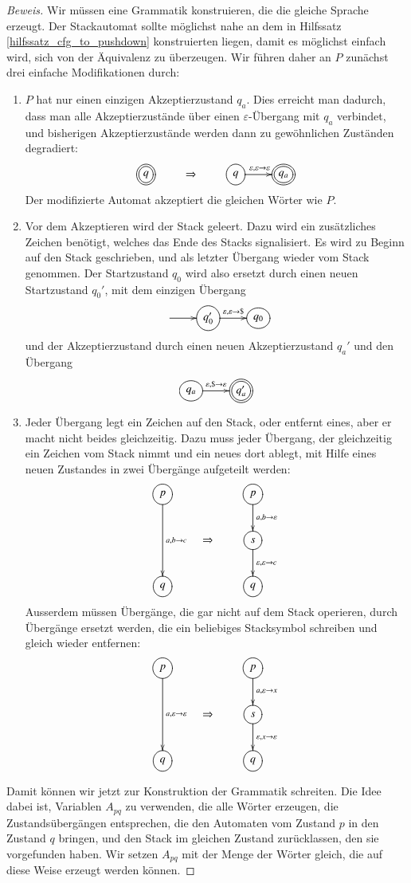 \begin{proof}[Beweis]
Wir müssen eine Grammatik konstruieren, die die gleiche Sprache
erzeugt.
Der Stackautomat sollte möglichst nahe an dem in
Hilfssatz \ref{hilfssatz_cfg_to_pushdown} konstruierten liegen, damit es
möglichst einfach wird, sich von der Äquivalenz zu überzeugen.
Wir führen daher an $P$ zunächst drei einfache Modifikationen
durch: 
\begin{enumerate}
\item $P$ hat nur einen einzigen Akzeptierzustand
$q_a$.
Dies erreicht man dadurch, dass man alle Akzeptierzustände über
einen $\varepsilon$-Übergang mit
$q_a$ verbindet, und bisherigen Akzeptierzustände
werden dann zu gewöhnlichen Zuständen degradiert:
\[
\xymatrix{
*++[o][F=]{q}
	&\Rightarrow
		&*++[o][F]{q}\ar[r]^{\varepsilon,\varepsilon\to\varepsilon}
			&*++[o][F=]{q_a}
}		
\]
Der modifizierte Automat akzeptiert die gleichen Wörter wie $P$.
\item Vor dem Akzeptieren wird der Stack geleert.
Dazu wird ein zusätzliches
Zeichen benötigt, welches das Ende des Stacks signalisiert.
Es wird zu
Beginn auf den Stack geschrieben, und als letzter Übergang wieder
vom Stack genommen.
Der Startzustand $q_0$ wird also ersetzt durch einen neuen
Startzustand $q_0'$, mit dem einzigen Übergang 
\[
\entrymodifiers={++[o][F]}
\xymatrix{
*+\txt{}\ar[r]
	&{q_0'}\ar[r]^{\varepsilon,\varepsilon\to {\tt\$}}
		&q_0
}
\]
und der Akzeptierzustand  durch einen neuen Akzeptierzustand $q_a'$ und
den Übergang
\[
\entrymodifiers={++[o][F]}
\xymatrix{
{q_a}\ar[r]^{\varepsilon,{\tt\$}\to\varepsilon}
	&*++[o][F=]{q_a'}
}
\]
\item Jeder Übergang legt ein Zeichen auf den Stack, oder entfernt
eines, aber er macht nicht beides gleichzeitig.
Dazu muss jeder Übergang,
der gleichzeitig ein Zeichen vom Stack nimmt und ein neues dort ablegt,
mit Hilfe eines neuen Zustandes in zwei Übergänge aufgeteilt werden:
\[
\xymatrix{
*++[o][F]{p}\ar[dd]^{a,b\to c}
	&*+\txt{}
		&*++[o][F]{p}\ar[d]^{a,b\to\varepsilon}
\\
	&\Rightarrow
		&*++[o][F]{s}\ar[d]^{\varepsilon,\varepsilon\to c}
\\
*++[o][F]{q}
	&
		&*++[o][F]{q}
}
\]
Ausserdem müssen Übergänge, die gar nicht auf dem Stack operieren,
durch Übergänge ersetzt werden, die ein beliebiges Stacksymbol
schreiben und gleich wieder entfernen:
\[
\xymatrix{
*++[o][F]{p}\ar[dd]^{a,\varepsilon\to \varepsilon}
	&*+\txt{}
		&*++[o][F]{p}\ar[d]^{a,\varepsilon\to x}
\\
	&\Rightarrow
		&*++[o][F]{s}\ar[d]^{\varepsilon,x\to \varepsilon}
\\
*++[o][F]{q}
	&
		&*++[o][F]{q}
}
\]
\end{enumerate}
Damit können wir jetzt zur Konstruktion der Grammatik schreiten.
Die Idee dabei ist, Variablen $A_{pq}$ zu verwenden, die alle 
Wörter erzeugen, die Zustandsübergängen entsprechen,
die den Automaten vom Zustand $p$ in den Zustand $q$ bringen,
und den Stack im gleichen Zustand zurücklassen, den sie vorgefunden
haben.
Wir setzen $A_{pq}$ mit der Menge der Wörter gleich, die
auf diese Weise erzeugt werden können.


\end{proof}
